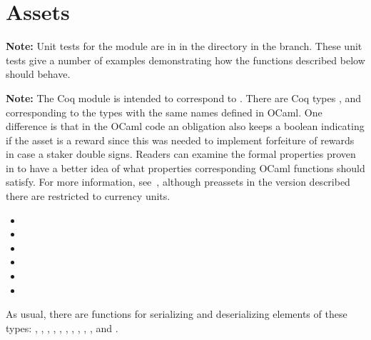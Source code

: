 

\section{Assets}


{\bf{Note:}} Unit tests for the {} module are in {}
in the {}
directory in the {} branch.
These unit tests give a number of examples demonstrating how the functions described below should behave.

{\bf{Note:}} The Coq module {} is intended to correspond to {}.
There are Coq types {}, {} and {}
corresponding to the types with the same names defined in OCaml.
One difference is that in the OCaml code an obligation also keeps a boolean indicating if the
asset is a reward since this was needed to implement forfeiture of rewards in case a staker
double signs.
Readers can examine the formal properties proven in {} to have a better
idea of what properties corresponding OCaml functions should satisfy.
For more information, see~\cite{White2015b}, although preassets in the version described there are restricted to currency units.

\begin{itemize}
\item {}
\item {}
\item {}
\item {}
\item {}
\item {}
\end{itemize}

As usual, there are functions for serializing and deserializing elements of these types:
{},
{},
{},
{},
{},
{},
{},
{},
{},
{},
{}
and
{}.


